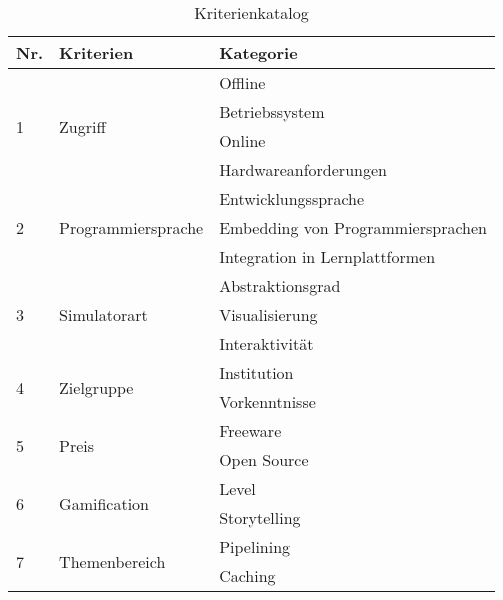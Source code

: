 \begin{table}[h!]

\centering
\caption{Kriterienkatalog}
\label{tab:kriterien}
\small

\begin{tabular}{|l|l|l|}
\hline

\textbf{Nr.} & \textbf{Kriterien} & \textbf{Kategorie} \\
\hline

\multirow{4}{*}{1} & \multirow{4}{*}{Zugriff} & Offline \\
                   &                          & Betriebssystem \\
                   &                          & Online \\
                   &                          & Hardwareanforderungen \\
\hline

\multirow{3}{*}{2} & \multirow{3}{*}{Programmiersprache} & Entwicklungssprache \\
                   &                                     & Embedding von Programmiersprachen \\
                   &                                     & Integration in Lernplattformen \\
\hline

\multirow{3}{*}{3} & \multirow{3}{*}{Simulatorart} & Abstraktionsgrad \\
                   &                               & Visualisierung \\
                   &                               & Interaktivität \\
\hline

\multirow{2}{*}{4} & \multirow{2}{*}{Zielgruppe} & Institution \\
                   &                             & Vorkenntnisse \\
\hline

\multirow{2}{*}{5} & \multirow{2}{*}{Preis} & Freeware \\
                   &                        & Open Source \\
\hline

\multirow{2}{*}{6} & \multirow{2}{*}{Gamification} & Level \\
                   &                               & Storytelling \\
\hline

\multirow{2}{*}{7} & \multirow{2}{*}{Themenbereich} & Pipelining \\ 
                   &                                & Caching \\
\hline


\end{tabular}
\end{table}
